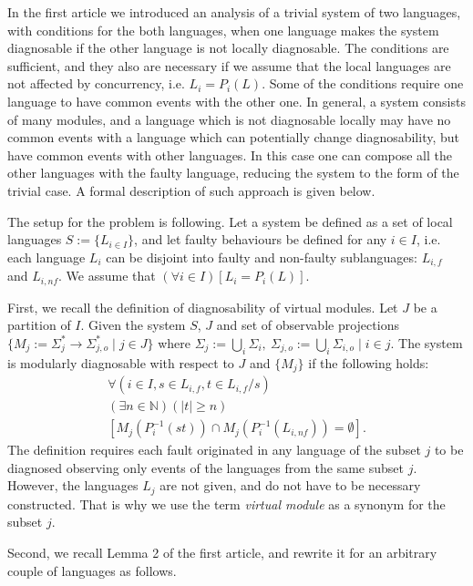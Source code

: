 \documentclass[a4paper, 10pt, conference]{ieeeconf}
\begin{document}
In the first article we introduced an analysis of a trivial system of two
languages, with conditions for the both languages, when one language makes the
system diagnosable if the other language is not locally diagnosable.
The conditions are sufficient, and they also are necessary if we assume that the
local languages are not affected by concurrency, i.e. $L_i = P_i(L)$. Some of
the conditions require one language to have common events with the other one. In
general, a system consists of many modules, and a language which is not
diagnosable locally may have no common events with a language which can
potentially change diagnosability, but have common events with other languages.
In this case one can compose all the other languages with the faulty language,
reducing the system to the form of the trivial case. A formal description of
such approach is given below.

The setup for the problem is following. Let a system be defined as a set of
local languages $S := \{L_{i\in I}\}$, and let faulty behaviours be defined for
any $i \in I$, i.e. each language $L_i$ can be disjoint into faulty and
non-faulty sublanguages: $L_{i,f}$ and $L_{i,nf}$. We assume that $(\forall i
\in I)\left[ L_i = P_i(L)\right]$.

First, we recall the definition of diagnosability of virtual modules. Let $J$ be
a partition of $I$. Given the system $S$, $J$ and set of observable
projections $\{M_j := \Sigma_j^* \rightarrow \Sigma_{j,o}^* \mid j \in J \}$
where $\Sigma_j := \bigcup_i \Sigma_i,~ 
	\Sigma_{j,o} := \bigcup_i \Sigma_{i,o} \mid 
	i\in j$. 
The system is modularly diagnosable with respect to $J$ and $\{M_j\}$ 
if the following holds:
\begin{equation}
	\begin{array}{l}
		\forall(i \in I, s \in L_{i,f}, t \in L_{i,f}/s)
		\\
		(\exists n \in \mathbb{N})
		(|t| \geq n)
		\\
		\left[ M_j(P_i^{-1}(st)) \cap M_j(P_i^{-1}(L_{i,nf})) = \emptyset \right].
	\end{array}
\end{equation}
The definition requires each fault originated in any language of the subset $j$
to be diagnosed observing only events of the languages from the same subset $j$.
However, the languages $L_j$ are not given, and do not have to be necessary
constructed. That is why we use the term \emph{virtual module} as a synonym for
the subset $j$.

Second, we recall Lemma 2 of the first article, and rewrite it for an arbitrary
couple of languages as follows.
\end{document}
